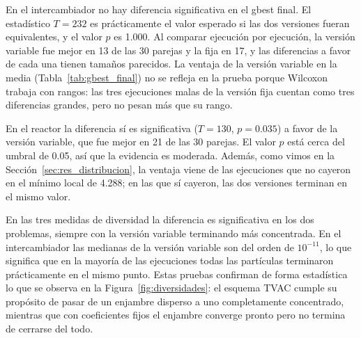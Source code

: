 En el intercambiador no hay diferencia significativa en el gbest final. El estadístico $T = 232$ es prácticamente el valor esperado si las dos versiones fueran equivalentes, y el valor $p$ es 1.000. Al comparar ejecución por ejecución, la versión variable fue mejor en 13 de las 30 parejas y la fija en 17, y las diferencias a favor de cada una tienen tamaños parecidos. La ventaja de la versión variable en la media (Tabla~\ref{tab:gbest_final}) no se refleja en la prueba porque Wilcoxon trabaja con rangos: las tres ejecuciones malas de la versión fija cuentan como tres diferencias grandes, pero no pesan más que su rango.

En el reactor la diferencia sí es significativa ($T = 130$, $p = 0.035$) a favor de la versión variable, que fue mejor en 21 de las 30 parejas. El valor $p$ está cerca del umbral de 0.05, así que la evidencia es moderada. Además, como vimos en la Sección~\ref{sec:res_distribucion}, la ventaja viene de las ejecuciones que no cayeron en el mínimo local de 4.288; en las que sí cayeron, las dos versiones terminan en el mismo valor.

En las tres medidas de diversidad la diferencia es significativa en los dos problemas, siempre con la versión variable terminando más concentrada. En el intercambiador las medianas de la versión variable son del orden de $10^{-11}$, lo que significa que en la mayoría de las ejecuciones todas las partículas terminaron prácticamente en el mismo punto. Estas pruebas confirman de forma estadística lo que se observa en la Figura~\ref{fig:diversidades}: el esquema TVAC cumple su propósito de pasar de un enjambre disperso a uno completamente concentrado, mientras que con coeficientes fijos el enjambre converge pronto pero no termina de cerrarse del todo.

